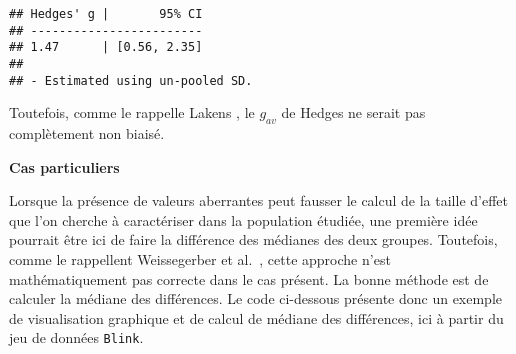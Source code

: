 \documentclass[
  french,
]{book}
\begin{document}
\begin{verbatim}
## Hedges' g |       95% CI
## ------------------------
## 1.47      | [0.56, 2.35]
## 
## - Estimated using un-pooled SD.
\end{verbatim}

Toutefois, comme le rappelle Lakens \autocite*{lakensCalculatingReportingEffect2013}, le \(g_{av}\) de Hedges ne serait pas complètement non biaisé.

\textbf{Cas particuliers}

Lorsque la présence de valeurs aberrantes peut fausser le calcul de la taille d'effet que l'on cherche à caractériser dans la population étudiée, une première idée pourrait être ici de faire la différence des médianes des deux groupes. Toutefois, comme le rappellent Weissegerber et al.~\autocite*{weissgerberBarLineGraphs2015}, cette approche n'est mathématiquement pas correcte dans le cas présent. La bonne méthode est de calculer la médiane des différences. Le code ci-dessous présente donc un exemple de visualisation graphique et de calcul de médiane des différences, ici à partir du jeu de données \texttt{Blink}.
\end{document}
